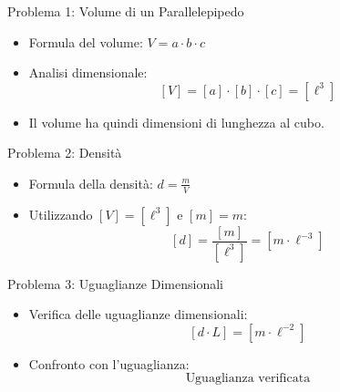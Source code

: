 \documentclass{beamer}
\begin{document}
\begin{frame}{Problema 1: Volume di un Parallelepipedo}
    \begin{itemize}
        \item Formula del volume: \( V = a \cdot b \cdot c \)
        \item Analisi dimensionale:
        \[
        [V] = [a] \cdot [b] \cdot [c] = [\ell^3]
        \]
        \item Il volume ha quindi dimensioni di lunghezza al cubo.
    \end{itemize}
\end{frame}

\begin{frame}{Problema 2: Densità}
    \begin{itemize}
        \item Formula della densità: \( d = \frac{m}{V} \)
        \item Utilizzando \( [V] = [\ell^3] \) e \( [m] = m \):
        \[
        [d] = \frac{[m]}{[\ell^3]} = [m \cdot \ell^{-3}]
        \]
    \end{itemize}
\end{frame}

\begin{frame}{Problema 3: Uguaglianze Dimensionali}
    \begin{itemize}
        \item Verifica delle uguaglianze dimensionali:
        \[
        [d \cdot L] = [m \cdot \ell^{-2}]
        \]
        \item Confronto con l'uguaglianza:
        \[
        \text{Uguaglianza verificata}
        \]
    \end{itemize}
\end{frame}
\end{document}
